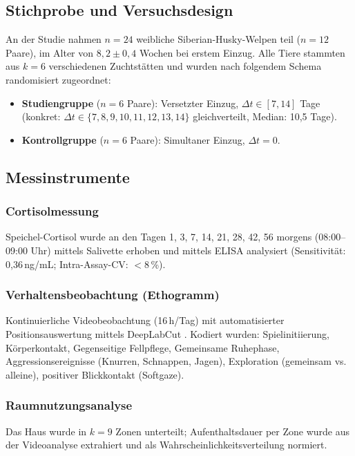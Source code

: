﻿\documentclass[12pt, a4paper]{article}
\theoremstyle{plain}
\theoremstyle{definition}
\theoremstyle{remark}
\newcommand{\dt}{\Delta t}
\begin{document}
\subsection{Stichprobe und Versuchsdesign}

An der Studie nahmen $n = 24$ weibliche Siberian-Husky-Welpen teil ($n = 12$
Paare), im Alter von $8{,}2 \pm 0{,}4$ Wochen bei erstem Einzug.
Alle Tiere stammten aus $k = 6$ verschiedenen Zuchtstätten und wurden nach
folgendem Schema randomisiert zugeordnet:

\begin{itemize}[leftmargin=*]
  \item \textbf{Studiengruppe} ($n = 6$ Paare): Versetzter Einzug, $\dt \in [7, 14]$
    Tage (konkret: $\dt \in \{7, 8, 9, 10, 11, 12, 13, 14\}$ gleichverteilt,
    Median: 10{,}5 Tage).
  \item \textbf{Kontrollgruppe} ($n = 6$ Paare): Simultaner Einzug, $\dt = 0$.
\end{itemize}

\subsection{Messinstrumente}

\subsubsection{Cortisolmessung}
Speichel-Cortisol wurde an den Tagen 1, 3, 7, 14, 21, 28, 42, 56
morgens (08:00--09:00 Uhr) mittels Salivette erhoben und mittels
ELISA analysiert (Sensitivität: 0{,}36\,ng/mL; Intra-Assay-CV:
$<$8\,\%).

\subsubsection{Verhaltensbeobachtung (Ethogramm)}
Kontinuierliche Videobeobachtung (16\,h/Tag) mit automatisierter
Positionsauswertung mittels DeepLabCut \cite{mathis2018deeplabcut}.
Kodiert wurden: Spielinitiierung, Körperkontakt, Gegenseitige Fellpflege,
Gemeinsame Ruhephase, Aggressionsereignisse (Knurren, Schnappen, Jagen),
Exploration (gemeinsam vs. alleine), positiver Blickkontakt (Softgaze).

\subsubsection{Raumnutzungsanalyse}
Das Haus wurde in $k = 9$ Zonen unterteilt; Aufenthaltsdauer per Zone
wurde aus der Videoanalyse extrahiert und als Wahrscheinlichkeitsverteilung
normiert.
\end{document}
